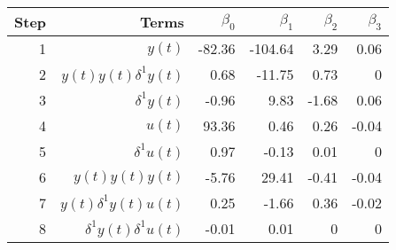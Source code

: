 \begin{tabular}{rrrrrr}
Step & Terms & $\beta_{0}$ & $\beta_{1}$ & $\beta_{2}$ & $\beta_{3}$ \\ 
\hline 
1 & $y(t)$ & -82.36 & -104.64 & 3.29 & 0.06 \\ 
2 & $y(t)y(t)\delta^1 y(t)$ & 0.68 & -11.75 & 0.73 & 0 \\ 
3 & $\delta^1 y(t)$ & -0.96 & 9.83 & -1.68 & 0.06 \\ 
4 & $u(t)$ & 93.36 & 0.46 & 0.26 & -0.04 \\ 
5 & $\delta^1 u(t)$ & 0.97 & -0.13 & 0.01 & 0 \\ 
6 & $y(t)y(t)y(t)$ & -5.76 & 29.41 & -0.41 & -0.04 \\ 
7 & $y(t)\delta^1 y(t)u(t)$ & 0.25 & -1.66 & 0.36 & -0.02 \\ 
8 & $\delta^1 y(t)\delta^1 u(t)$ & -0.01 & 0.01 & 0 & 0 \\ 
\hline 
\end{tabular}